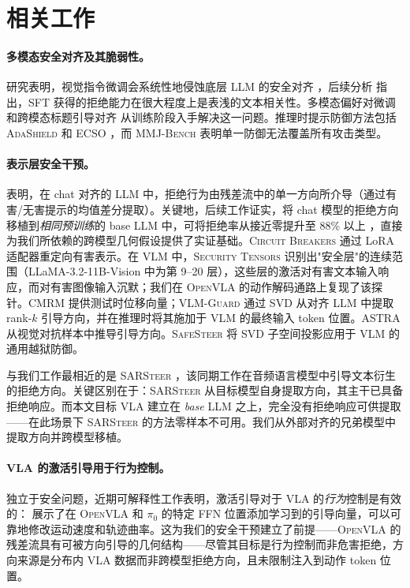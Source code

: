 \section{相关工作}
\label{sec:related}

\paragraph{多模态安全对齐及其脆弱性。}
研究表明，视觉指令微调会系统性地侵蚀底层 LLM 的安全对齐 \cite{vlguard2024}，后续分析 \cite{safemirage2025} 指出，SFT 获得的拒绝能力在很大程度上是表浅的文本相关性。多模态偏好对微调 \cite{spavl2024} 和跨模态标题引导对齐 \cite{cmrt2025} 从训练阶段入手解决这一问题。推理时提示防御方法包括 \textsc{AdaShield} \cite{adashield2024} 和 \textsc{ECSO} \cite{ecso2024}，而 \textsc{MMJ-Bench} \cite{mmjbench2024} 表明单一防御无法覆盖所有攻击类型。

\paragraph{表示层安全干预。}
\citet{arditi2024refusal} 表明，在 chat 对齐的 LLM 中，拒绝行为由残差流中的单一方向所介导（通过有害/无害提示的均值差分提取）。关键地，后续工作证实，将 chat 模型的拒绝方向移植到\emph{相同预训练}的 base LLM 中，可将拒绝率从接近零提升至 88\% 以上 \cite{baselmsrefuse2024}，直接为我们所依赖的跨模型几何假设提供了实证基础。\textsc{Circuit Breakers} \cite{circuitbreakers2024} 通过 LoRA 适配器重定向有害表示。在 VLM 中，\textsc{Security Tensors} \cite{securitytensors2025} 识别出"安全层"的连续范围（LLaMA-3.2-11B-Vision 中为第 9--20 层），这些层的激活对有害文本输入响应，而对有害图像输入沉默；我们在 \textsc{OpenVLA} 的动作解码通路上复现了该探针。\textsc{CMRM} \cite{cmrm2025} 提供测试时位移向量；\textsc{VLM-Guard} \cite{vlmguard2025} 通过 SVD 从对齐 LLM 中提取 rank-$k$ 引导方向，并在推理时将其施加于 VLM 的最终输入 token 位置。\textsc{ASTRA} \cite{astra2025} 从视觉对抗样本中推导引导方向。\textsc{SafeSteer} \cite{safesteer2025} 将 SVD 子空间投影应用于 VLM 的通用越狱防御。

与我们工作最相近的是 \textsc{SARSteer} \cite{sarsteer2025}，该同期工作在音频语言模型中引导文本衍生的拒绝方向。关键区别在于：\textsc{SARSteer} 从目标模型自身提取方向，其主干已具备拒绝响应。而本文目标 VLA 建立在 \emph{base} LLM 之上，完全没有拒绝响应可供提取——在此场景下 \textsc{SARSteer} 的方法零样本不可用。我们从外部对齐的兄弟模型中提取方向并跨模型移植。

\paragraph{VLA 的激活引导用于行为控制。}
独立于安全问题，近期可解释性工作表明，激活引导对于 VLA 的\emph{行为}控制是有效的：\citet{mechinterpvla2025} 展示了在 \textsc{OpenVLA} 和 \textsc{$\pi_0$} 的特定 FFN 位置添加学习到的引导向量，可以可靠地修改运动速度和轨迹曲率。这为我们的安全干预建立了前提——\textsc{OpenVLA} 的残差流具有可被方向引导的几何结构——尽管其目标是行为控制而非危害拒绝，方向来源是分布内 VLA 数据而非跨模型拒绝方向，且未限制注入到动作 token 位置。

